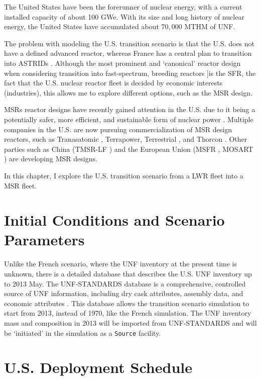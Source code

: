 
The United States have been the forerunner of nuclear energy, with a current
installed capacity of about 100 GWe. With its size and long history of nuclear
energy, the United States have accumulated about $70,000$ \gls{MTHM} of \gls{UNF}.

The problem with modeling the U.S. transition scenario is that the U.S. does not have
a defined advanced reactor, whereas France has a central plan to transition into \glspl{ASTRID} \cite{boullis_french_2015, varaine_pre-conceptual_2012}.
Although the most prominent and `canonical' reactor design when considering
transition into fast-spectrum, breeding reactors ]is the \gls{SFR},
the fact that the U.S. nuclear reactor fleet
is decided by economic interests (industries), this allows me to explore
different options, such as the \gls{MSR} design.

\glspl{MSR} reactor designs have recently gained attention in the U.S. due to it being a
potentially safer, more efficient, and sustainable form of nuclear power
\cite{serp_molten_2014}. Multiple companies in the U.S. are now pursuing
commercialization of \gls{MSR} design reactors, such as Tranasatomic \cite{transatomic_technical_2016}
, Terrapower, Terrestrial \cite{leblanc_18-_2017}, and
Thorcon \cite{dolan_19-_2017}. Other parties such as China (TMSR-LF \cite{dai_17-_2017}) 
and the European Union (MSFR \cite{heuer_towards_2014}, MOSART \cite{ignatiev_molten_2014})
are developing \gls{MSR} designs.

In this chapter, I explore the U.S. transition scenario
from a \gls{LWR} fleet into a \gls{MSR} fleet.

\section{Initial Conditions and Scenario Parameters}
Unlike the French scenario,
where the \gls{UNF} inventory at the present time is unknown, there is a
detailed database that describes the U.S. \gls{UNF} inventory up to 2013 May.
The \gls{UNF-STANDARDS} database is a comprehensive,
controlled source of \gls{UNF} information, including dry cask attributes, assembly
data, and economic attributes \cite{peterson_unf-st&dards_2017}. This database
allows the transition scenario simulation to start from 2013, instead of 1970,
like the French simulation. The \gls{UNF} inventory mass and composition in 2013
will be imported from \gls{UNF-STANDARDS} and will be `initiated' in the simulation
as a \texttt{Source} facility. 

\section{U.S. Deployment Schedule}

